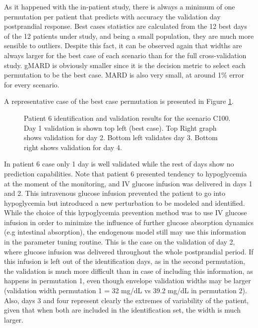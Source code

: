 As it happened with the in-patient study, there is always a minimum of one permutation per patient that predicts with accuracy the validation day postprandial response. Best cases statistics are calculated from the 12 best days of the 12 patients under study, and being a small population, they are much more sensible to outliers. Despite this fact, it can be observed again that widths are always larger for the best case of each scenario than for the full cross-validation study. gMARD is obviously smaller since it is the decision metric to select each permutation to be the best case. MARD is also very small, at around 1\% error for every scenario.

A representative case of the best case permutation is presented in Figure \ref{fig:ysiscinspatient6}.

\begin{figure}[hbt]
\centering
{}\caption{Patient 6 identification and validation results for the scenario C100. Day 1 validation is shown top left (best case). Top Right graph shows validation for day 2. Bottom left validates day 3. Bottom right shows validation for day 4.}
\label{fig:ysiscinspatient6}
\end{figure}

In patient 6 case only 1 day is well validated while the rest of days show no prediction capabilities. Note that patient 6 presented tendency to hypoglycemia at the moment of the monitoring, and IV glucose infusion was delivered in days 1 and 2. This intravenous glucose infusion prevented the patient to go into hypoglycemia but introduced a new perturbation to be modeled and identified. While the choice of this hypoglycemia prevention method was to use IV glucose infusion in order to minimize the influence of further glucose absorption dynamics (e.g intestinal absorption), the endogenous model still may use this information in the parameter tuning routine. This is the case on the validation of day 2, where glucose infusion was delivered throughout the whole postprandial period. If this infusion is left out of the identification days, as in the second permutation, the validation is much more difficult than in case of including this information, as happens in permutation 1, even though envelope validation widths may be larger (validation width permutation 1 = 32 mg/dL vs 39.2 mg/dL in permutation 2). Also, days 3 and four represent clearly the extremes of variability of the patient, given that when both are included in the identification set, the width is much larger.

